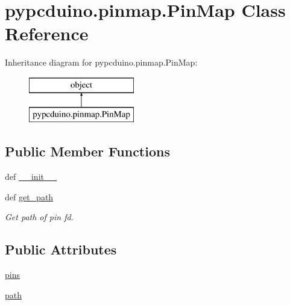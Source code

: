 \hypertarget{classpypcduino_1_1pinmap_1_1_pin_map}{\section{pypcduino.\-pinmap.\-Pin\-Map Class Reference}
\label{classpypcduino_1_1pinmap_1_1_pin_map}
}
Inheritance diagram for pypcduino.\-pinmap.\-Pin\-Map\-:\begin{figure}[H]
\begin{center}
\leavevmode
\includegraphics[height=2.000000cm]{classpypcduino_1_1pinmap_1_1_pin_map}
\end{center}
\end{figure}
\subsection*{Public Member Functions}
\begin{DoxyCompactItemize}
\item 
def \hyperlink{classpypcduino_1_1pinmap_1_1_pin_map_a712995745c0380ac734e5130b10f8d62}{\-\_\-\-\_\-init\-\_\-\-\_\-}
\item 
def \hyperlink{classpypcduino_1_1pinmap_1_1_pin_map_a64d87476c527114d9da64365d317ebf5}{get\-\_\-path}
\begin{DoxyCompactList}\small\item\em Get path of pin fd. \end{DoxyCompactList}\end{DoxyCompactItemize}
\subsection*{Public Attributes}
\begin{DoxyCompactItemize}
\item 
\hyperlink{classpypcduino_1_1pinmap_1_1_pin_map_ade5e4f0ef3667e1b1cd2fd35af39029e}{pins}
\item 
\hyperlink{classpypcduino_1_1pinmap_1_1_pin_map_a472b81fe48d6d7acbb1d4a637d870be9}{path}
\end{DoxyCompactItemize}


